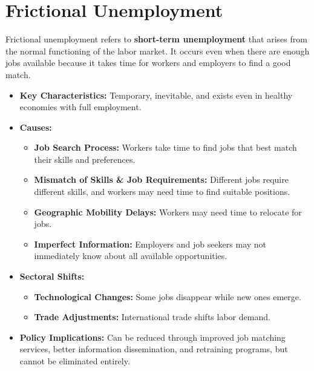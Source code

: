 \documentclass[a4paper, 11pt]{article}
\begin{document}
\section{Frictional Unemployment}
Frictional unemployment refers to \textbf{short-term unemployment} that arises from the normal functioning of the labor market. It occurs even when there are enough jobs available because it takes time for workers and employers to find a good match.
\begin{itemize}
    \item \textbf{Key Characteristics:} Temporary, inevitable, and exists even in healthy economies with full employment.
    \item \textbf{Causes:}
    \begin{itemize}
        \item \textbf{Job Search Process:} Workers take time to find jobs that best match their skills and preferences.
        \item \textbf{Mismatch of Skills \& Job Requirements:} Different jobs require different skills, and workers may need time to find suitable positions.
        \item \textbf{Geographic Mobility Delays:} Workers may need time to relocate for jobs.
        \item \textbf{Imperfect Information:} Employers and job seekers may not immediately know about all available opportunities.
    \end{itemize}
    \item \textbf{Sectoral Shifts:}
    \begin{itemize}
        \item \textbf{Technological Changes:} Some jobs disappear while new ones emerge.
        \item \textbf{Trade Adjustments:} International trade shifts labor demand.
    \end{itemize}
    \item \textbf{Policy Implications:} Can be reduced through improved job matching services, better information dissemination, and retraining programs, but cannot be eliminated entirely.
\end{itemize}
\end{document}
